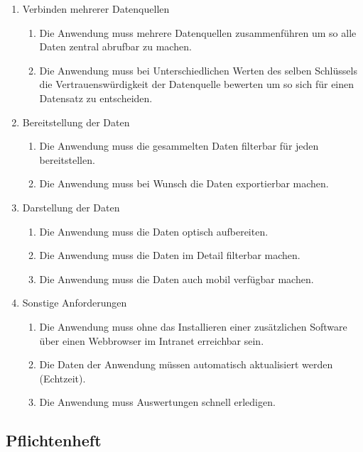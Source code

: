 \begin{enumerate}
	\item Verbinden mehrerer Datenquellen
	\begin{enumerate}
		\item Die Anwendung muss mehrere Datenquellen zusammenführen um so alle Daten zentral abrufbar zu machen.
		\item Die Anwendung muss bei Unterschiedlichen Werten des selben Schlüssels die Vertrauenswürdigkeit der Datenquelle bewerten um so sich für einen Datensatz zu entscheiden.
	\end{enumerate}
	\item Bereitstellung der Daten
	\begin{enumerate}
		\item Die Anwendung muss die gesammelten Daten filterbar für jeden bereitstellen.
		\item Die Anwendung muss bei Wunsch die Daten exportierbar machen.
	\end{enumerate}
	\item Darstellung der Daten
	\begin{enumerate}
		\item Die Anwendung muss die Daten optisch aufbereiten.
		\item Die Anwendung muss die Daten im Detail filterbar machen.
		\item Die Anwendung muss die Daten auch mobil verfügbar machen.
	\end{enumerate}
	\item Sonstige Anforderungen
	\begin{enumerate}
		\item Die Anwendung muss ohne das Installieren einer zusätzlichen Software über einen Webbrowser im Intranet erreichbar sein.
		\item Die Daten der Anwendung müssen automatisch aktualisiert werden (Echtzeit).
		\item Die Anwendung muss Auswertungen schnell erledigen.
	\end{enumerate}
\end{enumerate}

\subsection{Pflichtenheft}